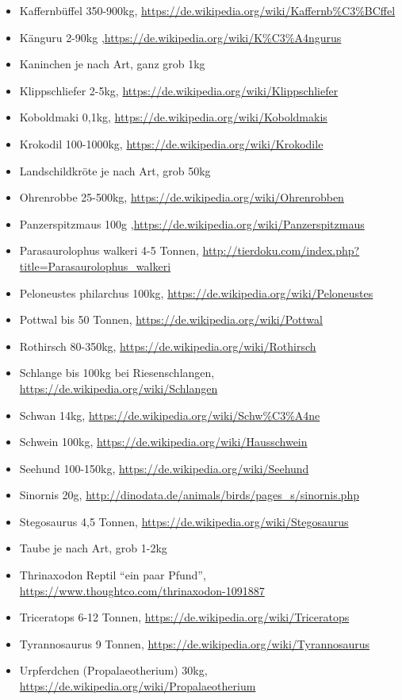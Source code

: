 \begin{itemize}
  \item Kaffernbüffel 350-900kg, \url{https://de.wikipedia.org/wiki/Kaffernb\%C3\%BCffel}
  \item Känguru 2-90kg ,\url{https://de.wikipedia.org/wiki/K\%C3\%A4ngurus}
  \item Kaninchen je nach Art, ganz grob 1kg
  \item Klippschliefer 2-5kg, \url{https://de.wikipedia.org/wiki/Klippschliefer}
  \item Koboldmaki 0,1kg, \url{https://de.wikipedia.org/wiki/Koboldmakis}
  \item Krokodil 100-1000kg, \url{https://de.wikipedia.org/wiki/Krokodile}
  \item Landschildkröte je nach Art, grob 50kg
  \item Ohrenrobbe 25-500kg, \url{https://de.wikipedia.org/wiki/Ohrenrobben}
  \item Panzerspitzmaus 100g ,\url{https://de.wikipedia.org/wiki/Panzerspitzmaus}
  \item Parasaurolophus walkeri 4-5 Tonnen, \url{http://tierdoku.com/index.php?title=Parasaurolophus_walkeri}
  \item Peloneustes philarchus 100kg, \url{https://de.wikipedia.org/wiki/Peloneustes}
  \item Pottwal bis 50 Tonnen, \url{https://de.wikipedia.org/wiki/Pottwal}
  \item Rothirsch 80-350kg, \url{https://de.wikipedia.org/wiki/Rothirsch}
  \item Schlange bis 100kg bei Riesenschlangen, \url{https://de.wikipedia.org/wiki/Schlangen}
  \item Schwan 14kg, \url{https://de.wikipedia.org/wiki/Schw\%C3\%A4ne}
  \item Schwein 100kg, \url{https://de.wikipedia.org/wiki/Hausschwein}
  \item Seehund 100-150kg, \url{https://de.wikipedia.org/wiki/Seehund}
  \item Sinornis 20g, \url{http://dinodata.de/animals/birds/pages_s/sinornis.php}
  \item Stegosaurus 4,5 Tonnen, \url{https://de.wikipedia.org/wiki/Stegosaurus}
  \item Taube je nach Art, grob 1-2kg
  \item Thrinaxodon Reptil "`ein paar Pfund"', \url{https://www.thoughtco.com/thrinaxodon-1091887}
  \item Triceratops 6-12 Tonnen, \url{https://de.wikipedia.org/wiki/Triceratops}
  \item Tyrannosaurus 9 Tonnen, \url{https://de.wikipedia.org/wiki/Tyrannosaurus}
  \item Urpferdchen (Propalaeotherium) 30kg, \url{https://de.wikipedia.org/wiki/Propalaeotherium}
 \end{itemize}
 
